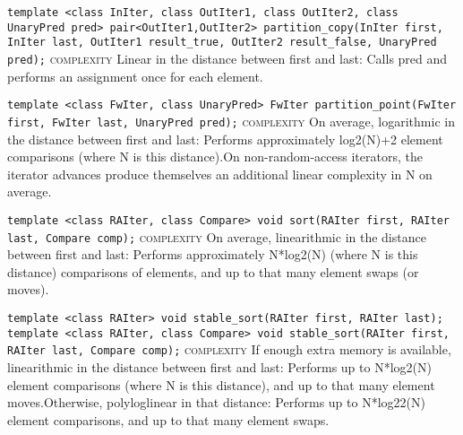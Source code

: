 \noindent{}\hspace*{0.25em}\lstinline[basicstyle=\ttfamily\color{corange}]{template <class InIter, class OutIter1, class OutIter2, class UnaryPred pred> pair<OutIter1,OutIter2> partition_copy(InIter first, InIter last, OutIter1 result_true, OutIter2 result_false, UnaryPred pred);} \textsc{complexity} Linear in the distance between first and last: Calls pred and performs an assignment once for each element.\\\vspace{-0.6em}

\noindent{}\hspace*{0.25em}\lstinline[basicstyle=\ttfamily\color{corange}]{template <class FwIter, class UnaryPred> FwIter partition_point(FwIter first, FwIter last, UnaryPred pred);} \textsc{complexity} On average, logarithmic in the distance between first and last: Performs approximately log2(N)+2 element comparisons (where N is this distance).On non-random-access iterators, the iterator advances produce themselves an additional linear complexity in N on average.\\\vspace{-0.6em}

\noindent{}\hspace*{0.25em}\lstinline[basicstyle=\ttfamily\color{cred}]{template <class RAIter, class Compare> void sort(RAIter first, RAIter last, Compare comp);} \textsc{complexity} On average, linearithmic in the distance between first and last: Performs approximately N*log2(N) (where N is this distance) comparisons of elements, and up to that many element swaps (or moves).\\\vspace{-0.6em}

\noindent{}\hspace*{0.25em}\lstinline[basicstyle=\ttfamily\color{cred}]{template <class RAIter> void stable_sort(RAIter first, RAIter last); template <class RAIter, class Compare> void stable_sort(RAIter first, RAIter last, Compare comp);} \textsc{complexity} If enough extra memory is available, linearithmic in the distance between first and last: Performs up to N*log2(N) element comparisons (where N is this distance), and up to that many element moves.Otherwise, polyloglinear in that distance: Performs up to N*log22(N) element comparisons, and up to that many element swaps.\\\vspace{-0.6em}


